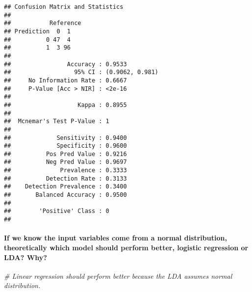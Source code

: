 \documentclass[
]{article}
\newenvironment{Shaded}{\begin{snugshade}}{\end{snugshade}}
\newcommand{\AttributeTok}[1]{\textcolor[rgb]{0.77,0.63,0.00}{#1}}
\newcommand{\CommentTok}[1]{\textcolor[rgb]{0.56,0.35,0.01}{\textit{#1}}}
\newcommand{\FunctionTok}[1]{\textcolor[rgb]{0.00,0.00,0.00}{#1}}
\newcommand{\NormalTok}[1]{#1}
\newcommand{\OtherTok}[1]{\textcolor[rgb]{0.56,0.35,0.01}{#1}}
\newcommand{\SpecialCharTok}[1]{\textcolor[rgb]{0.00,0.00,0.00}{#1}}
\begin{document}
\begin{Shaded}
\end{Shaded}

\begin{verbatim}
## Confusion Matrix and Statistics
## 
##           Reference
## Prediction  0  1
##          0 47  4
##          1  3 96
##                                          
##                Accuracy : 0.9533         
##                  95% CI : (0.9062, 0.981)
##     No Information Rate : 0.6667         
##     P-Value [Acc > NIR] : <2e-16         
##                                          
##                   Kappa : 0.8955         
##                                          
##  Mcnemar's Test P-Value : 1              
##                                          
##             Sensitivity : 0.9400         
##             Specificity : 0.9600         
##          Pos Pred Value : 0.9216         
##          Neg Pred Value : 0.9697         
##              Prevalence : 0.3333         
##          Detection Rate : 0.3133         
##    Detection Prevalence : 0.3400         
##       Balanced Accuracy : 0.9500         
##                                          
##        'Positive' Class : 0              
## 
\end{verbatim}

\hypertarget{if-we-know-the-input-variables-come-from-a-normal-distribution-theoretically-which-model-should-perform-better-logistic-regression-or-lda-why}{%
\paragraph{If we know the input variables come from a normal
distribution, theoretically which model should perform better, logistic
regression or LDA?
Why?}\label{if-we-know-the-input-variables-come-from-a-normal-distribution-theoretically-which-model-should-perform-better-logistic-regression-or-lda-why}}

\begin{Shaded}
\begin{Highlighting}[]
\CommentTok{\# Linear regression should perform better because the LDA assumes normal distribution.}
\end{Highlighting}
\end{Shaded}
\end{document}
